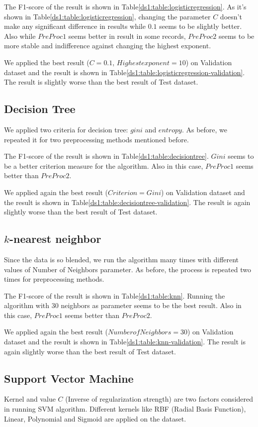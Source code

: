 The F1-score of the result is shown in Table\ref{ds1:table:logisticregression}.
As it's shown in Table\ref{ds1:table:logisticregression}, changing the parameter
$C$ doesn't make any significant difference in results while $0.1$ seems to be
slightly better. Also while $PreProc1$ seems better in result in some records, $PreProc2$ seems to be more stable and indifference against changing the highest exponent.


We applied the best result ($C=0.1$, $Highest exponent=10$) on Validation dataset and the result is shown in Table\ref{ds1:table:logisticregression-validation}. The result is slightly worse than the best result of Test dataset.


\subsection{Decision Tree}
We applied two criteria for decision tree: $gini$ and $entropy$. As before, we repeated it for two preprocessing methods mentioned before.

The F1-score of the result is shown in Table\ref{ds1:table:decisiontree}. $Gini$ seems to be a better criterion measure for the algorithm. Also in this case, $PreProc1$ seems better than $PreProc2$.

We applied again the best result ($Criterion=Gini$) on Validation dataset and the result is shown in Table\ref{ds1:table:decisiontree-validation}. The result is again slightly worse than the best result of Test dataset.

\subsection{$k$-nearest neighbor}
Since the data is so blended, we run the algorithm many times with different values of Number of Neighbors parameter. As before, the process is repeated two times for preprocessing methods.

The F1-score of the result is shown in Table\ref{ds1:table:knn}. Running the algorithm with $30$ neighbors as parameter seems to be the best result. Also in this case, $PreProc1$ seems better than $PreProc2$.

We applied again the best result ($Number of Neighbors=30$) on Validation dataset and the result is shown in Table\ref{ds1:table:knn-validation}. The result is again slightly worse than the best result of Test dataset.

\subsection{Support Vector Machine}
Kernel and value $C$ (Inverse of regularization strength) are two factors considered in running SVM algorithm. Different kernels like RBF (Radial Basis Function), Linear, Polynomial and Sigmoid are applied on the dataset.

